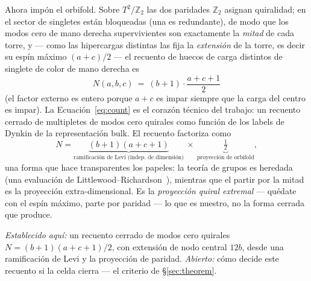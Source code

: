 \documentclass[11pt,a4paper]{article}
\newcommand{\ZZ}{\mathbb{Z}}
\begin{document}
Ahora impón el orbifold. Sobre $T^2/\mathbb{Z}_2$ las dos paridades $\ZZ_2$ asignan quiralidad;
en el sector de singletes están bloqueadas (una es redundante), de modo que los modos cero de
mano derecha supervivientes son exactamente la \emph{mitad} de cada torre, y --- como las
hipercargas distintas las fija la \emph{extensión} de la torre, es decir su espín máximo
$(a+c)/2$ --- el recuento de huecos de carga distintos de singlete de color de mano derecha es
\begin{equation}\label{eq:count}
\boxed{\,N(a,b,c)\ =\ (b+1)\cdot\frac{a+c+1}{2}\,}
\end{equation}
(el factor externo es entero porque $a+c$ es impar siempre que la carga del centro es impar).
La Ecuación~\eqref{eq:count} es el corazón técnico del trabajo: un recuento cerrado de
multipletes de modos cero quirales como función de los labels de Dynkin de la representación
bulk. El recuento factoriza como
\[
N=\underbrace{(b+1)(a+c+1)}_{\text{ramificación de Levi (indep.\ de dimensión)}}\ \times\ \underbrace{\tfrac12}_{\text{proyección de orbifold}},
\]
una forma que hace transparentes los papeles: la teoría de grupos es heredada (una evaluación
de Littlewood--Richardson~\cite{Fulton,GW}), mientras que el partir por la mitad es la
proyección extra-dimensional. Es la \emph{proyección quiral extremal} --- quédate con el espín
máximo, parte por paridad --- lo que es nuestro, no la forma cerrada que produce.

\emph{Establecido aquí:} un recuento cerrado de modos cero quirales $N=(b+1)(a+c+1)/2$, con
extensión de nodo central $12b$, desde una ramificación de Levi y la proyección de paridad.
\emph{Abierto:} cómo decide este recuento si la celda cierra --- el criterio de
\S\ref{sec:theorem}.
\end{document}
